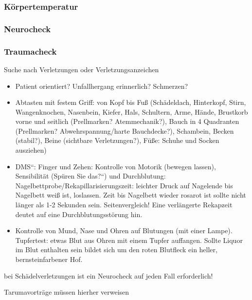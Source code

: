 \subsubsection{K\"orpertemperatur}

\subsubsection{Neurocheck}

\subsubsection{Traumacheck}
Suche nach Verletzungen oder Verletzungsanzeichen

\begin{itemize}
\item Patient orientiert? Unfallhergang erinnerlich? Schmerzen?

\end{itemize}
\begin{itemize}
\item Abtasten mit festem Griff: von Kopf bis Fu{\ss} (Sch\"adeldach,
Hinterkopf, Stirn, Wangenknochen, Nasenbein, Kiefer, Hals, Schultern,
Arme, H\"ande, Brustkorb vorne und seitlich (Prellmarken?
Atemmechanik?), Bauch in 4 Quadranten (Prellmarken?
Abwehrspannung/harte Bauchdecke?), Schambein, Becken (stabil?), Beine
(sichtbare Verletzungen?), F\"u{\ss}e: Schuhe und Socken ausziehen)

\item {\quotedblbase}DMS{\textquotedblleft}: Finger und Zehen: Kontrolle
von Motorik (bewegen lassen), Sensibilit\"at ({\quotedblbase}Sp\"uren
Sie das?{\textquotedblleft}) und Durchblutung:
Nagelbettprobe/Rekapillarisierungszeit: leichter Druck auf Nagelende
bis Nagelbett wei{\ss} ist, loslassen. Zeit bis Nagelbett wieder
rosarot ist sollte nicht l\"anger als 1-2 Sekunden sein.
Seitenvergleich! Eine verl\"angerte Rekapzeit deutet auf eine
Durchblutungsst\"orung hin.

\item Kontrolle von Mund, Nase und Ohren auf Blutungen (mit einer
Lampe). Tupfertest: etwas Blut aus Ohren mit einem Tupfer auffangen.
Sollte Liquor im Blut enthalten sein bildet sich um den roten Blutfleck
ein heller, bernsteinfarbener Hof.

\end{itemize}
bei Sch\"adelverletzungen ist ein Neurocheck auf jeden Fall
erforderlich!

Tarumavortr\"age m\"ussen hierher verweisen


